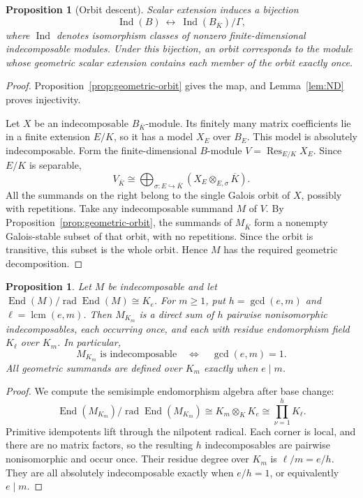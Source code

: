 \documentclass[11pt, reqno]{amsart}
\numberwithin{equation}{section}
\newtheorem{proposition}[theorem]{Proposition}
\theoremstyle{definition}
\theoremstyle{remark}
\newcommand{\op}[1]{\operatorname{#1}}
\newcommand{\GG}{\Gamma}
\newcommand{\Ind}{\op{Ind}}
\newcommand{\End}{\op{End}}
\newcommand{\rad}{\op{rad}}
\newcommand{\lcm}{\op{lcm}}
\newcommand{\Res}{\op{Res}}
\newcommand{\Kbar}{\overline K}
\newcommand{\iso}{\cong}
\newcommand{\into}{\hookrightarrow}
\begin{document}
\begin{proposition}[Orbit descent]\label{prop:descent}
Scalar extension induces a bijection
\[ \Ind(B)\ \longleftrightarrow\ \Ind(B_{\Kbar})/\GG, \]
where $\Ind$ denotes isomorphism classes of nonzero finite-dimensional
indecomposable modules. Under this bijection, an orbit corresponds to
the module whose geometric scalar extension contains each member of
the orbit exactly once.
\end{proposition}
\begin{proof}
Proposition~\ref{prop:geometric-orbit} gives the map, and
Lemma~\ref{lem:ND} proves injectivity.

Let $X$ be an indecomposable $B_{\Kbar}$-module. Its finitely many
matrix coefficients lie in a finite extension $E/K$, so it has a
model $X_E$ over $B_E$. This model is absolutely indecomposable.
Form the finite-dimensional $B$-module $V=\Res_{E/K}X_E$.
Since $E/K$ is separable,
\[ V_{\Kbar}\iso \bigoplus_{\sigma:E\into\Kbar}(X_E\otimes_{E,\sigma}\Kbar). \]
All the summands on the right belong to the single Galois orbit of
$X$, possibly with repetitions. Take any indecomposable summand $M$
of $V$. By Proposition~\ref{prop:geometric-orbit}, the summands of
$M_{\Kbar}$ form a nonempty Galois-stable subset of that orbit, with no repetitions.
Since the orbit is transitive, this subset is the whole orbit. Hence
$M$ has the required geometric decomposition.
\end{proof}


\begin{proposition}\label{prop:finitebase}
Let $M$ be indecomposable and let
$\End(M)/\rad\End(M)\iso K_e$. For $m\geq1$, put
$h=\gcd(e,m)$ and $\ell=\lcm(e,m)$. Then $M_{K_m}$ is a direct sum
of $h$ pairwise nonisomorphic indecomposables, each occurring once,
and each with residue endomorphism field $K_\ell$ over $K_m$.
In particular,
\[ M_{K_m}\text{ is indecomposable}\quad\Longleftrightarrow\quad \gcd(e,m)=1. \]
All geometric summands are defined over $K_m$ exactly when $e\mid m$.
\end{proposition}
\begin{proof}
We compute the semisimple endomorphism algebra after base change:
\[ \End(M_{K_m})/\rad\End(M_{K_m}) \iso K_m\otimes_KK_e \iso\prod_{\nu=1}^{h}K_\ell. \]
Primitive idempotents lift through the nilpotent radical. Each corner
is local, and there are no matrix factors, so the resulting $h$
indecomposables are pairwise nonisomorphic and occur once. Their
residue degree over $K_m$ is $\ell/m=e/h$. They are all absolutely
indecomposable exactly when $e/h=1$, or equivalently $e\mid m$.
\end{proof}
\end{document}
